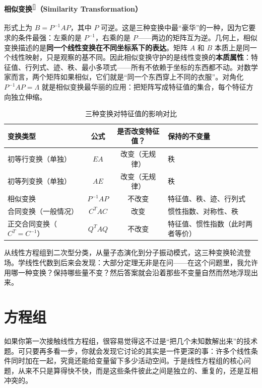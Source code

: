 \documentclass[UTF8]{ctexbook}
\begin{document}
\paragraph{相似变换\textsuperscript{[\pageref{Similarity_Transformation}]}（Similarity Transformation）}
形式上为 $B = P^{-1} A P$，其中 $P$ 可逆。这是三种变换中最“豪华”的一种，因为它要求的条件最强：左乘的是 $P^{-1}$，右乘的是 $P$——两边的矩阵互为逆。几何上，相似变换描述的是\textbf{同一个线性变换在不同坐标系下的表达}。矩阵 $A$ 和 $B$ 本质上是同一个线性映射，只是观察的基不同。因此相似变换守护的是线性变换的\textbf{本质属性}：特征值、行列式、迹、秩、最小多项式——所有不依赖于坐标的东西都不动。对数学家而言，两个矩阵如果相似，它们就是“同一个东西穿上不同的衣服”。对角化 $P^{-1}AP = \Lambda$ 就是相似变换最华丽的应用：把矩阵写成特征值的集合，每个特征方向独立伸缩。

\begin{table}[H]
  \centering
  \renewcommand{\arraystretch}{1.4}
  \begin{tabular}{l|c|c|l}
    \toprule
    变换类型 & 公式 & 是否改变特征值？ & 保持的不变量 \\
    \midrule
    初等行变换（单独） & $EA$ & 改变（无规律） & 秩 \\
    初等列变换（单独） & $AE$ & 改变（无规律） & 秩 \\
    相似变换 & $P^{-1}AP$ & 不改变 & 特征值、秩、迹、行列式 \\
    合同变换（一般情况） & $C^{\!T}AC$ & 改变 & 惯性指数、对称性、秩 \\
    正交合同变换（$C^{\!T}=C^{-1}$） & $Q^{\!T}AQ$ & 不改变 & 特征值、惯性指数（此时两者等价） \\
    \bottomrule
  \end{tabular}
  \caption{三种变换对特征值的影响对比}
\end{table}


从线性方程组到二次型分类，从量子态演化到分子振动模式，这三种变换轮流登场。学线性代数到后来会发现：大部分定理无非是在问——在这个问题里，我允许用哪一种变换？保持哪些量不变？然后答案就会沿着那些不变量自然而然地浮现出来。

\newpage

\section{方程组}


如果你第一次接触线性方程组，很容易觉得这不过是“把几个未知数解出来”的技术题。可只要再多看一步，你就会发现它讨论的其实是一件更深的事：许多个线性条件同时加在一起，究竟还能给变量留下多少活动空间。于是线性方程组的核心问题，从来不只是算得快不快，而是这些条件彼此之间是独立的、重复的，还是互相冲突的。
\end{document}
